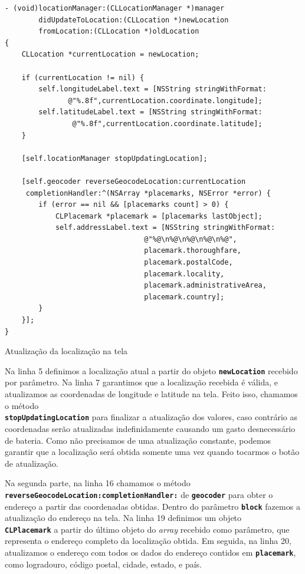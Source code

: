 \documentclass[a4paper,12pt,brazil,oneside]{book}
\begin{document}
\begin{listing}[H]
\begin{verbatim}
- (void)locationManager:(CLLocationManager *)manager
        didUpdateToLocation:(CLLocation *)newLocation
        fromLocation:(CLLocation *)oldLocation
{
    CLLocation *currentLocation = newLocation;
    
    if (currentLocation != nil) {
        self.longitudeLabel.text = [NSString stringWithFormat:
               @"%.8f",currentLocation.coordinate.longitude];
        self.latitudeLabel.text = [NSString stringWithFormat:
                @"%.8f",currentLocation.coordinate.latitude];
    }
    
    [self.locationManager stopUpdatingLocation];
    
    [self.geocoder reverseGeocodeLocation:currentLocation
     completionHandler:^(NSArray *placemarks, NSError *error) {
        if (error == nil && [placemarks count] > 0) {
            CLPlacemark *placemark = [placemarks lastObject];
            self.addressLabel.text = [NSString stringWithFormat:
                                 @"%@\n%@\n%@\n%@\n%@",
                                 placemark.thoroughfare,
                                 placemark.postalCode,
                                 placemark.locality,
                                 placemark.administrativeArea,
                                 placemark.country];
        }
    }];
}
\end{verbatim}
\caption{Atualização da localização na tela}
\end{listing}


Na linha 5 definimos a localização atual a partir do objeto \texttt{\textbf{newLocation}} recebido por parâmetro. Na linha 7 garantimos que a localização recebida é válida, e atualizamos as coordenadas de longitude e latitude na tela. Feito isso, chamamos o método\\ \texttt{\textbf{stopUpdatingLocation}} para finalizar a atualização dos valores, caso contrário as coordenadas serão atualizadas indefinidamente causando um gasto desnecessário de bateria. Como não precisamos de uma atualização constante, podemos garantir que a localização será obtida somente uma vez quando tocarmos o botão de atualização.

Na segunda parte, na linha 16 chamamos o método\\ \texttt{\textbf{reverseGeocodeLocation:completionHandler:}} de \texttt{\textbf{geocoder}} para obter o endereço a partir das coordenadas obtidas. Dentro do parâmetro \texttt{\textbf{block}} fazemos a atualização do endereço na tela. Na linha 19 definimos um objeto\\ \texttt{\textbf{CLPlacemark}} a partir do último objeto do \emph{array} recebido como parâmetro, que representa o endereço completo da localização obtida. Em seguida, na linha 20, atualizamos o endereço com todos os dados do endereço contidos em \texttt{\textbf{placemark}}, como logradouro, código postal, cidade, estado, e país.
\end{document}
